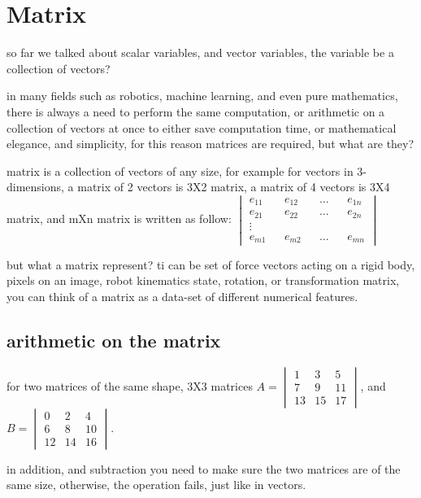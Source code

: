 \documentclass[4apaper,12pt]{book}
\begin{document}
  \section{Matrix}
  \begin{description}
  \item so far we talked about scalar variables, and vector variables, the variable be a collection of vectors?
    \item in many fields such as robotics, machine learning, and even pure mathematics, there is always a need to perform the same computation, or arithmetic on a collection of vectors at once to either save computation time, or mathematical elegance, and simplicity, for this reason matrices are required, but what are they?
    \item matrix is a collection of vectors of any size, for example for vectors in 3-dimensions, a matrix of 2 vectors is 3X2 matrix, a matrix of 4 vectors is 3X4 matrix, and mXn matrix is written as follow: $\begin{vmatrix}e_{11}&&e_{12}&&\dots&&e_{1n}\\e_{21}&&e_{22}&&\dots&&e_{2n}\\\vdots\\e_{m1}&&e_{m2}&&\dots&&e_{mn}\end{vmatrix}$
    \item but what a matrix represent? ti can be set of force vectors acting on a rigid body, pixels on an image, robot kinematics state, rotation, or transformation  matrix, you can think of a matrix as a data-set of different numerical features.

      \subsection{arithmetic on the matrix}
    \item for two matrices of the same shape, 3X3 matrices $A = \begin{vmatrix}1&3&5\\7&9&11\\13&15&17\end{vmatrix}$, and $B=\begin{vmatrix}0&2&4\\6&8&10\\12&14&16\end{vmatrix}$.
    \item in addition, and subtraction you need to make sure the two matrices are of the same size, otherwise, the operation fails, just like in vectors.
      \begin{description}

\end{description}
\end{description}
\end{document}

